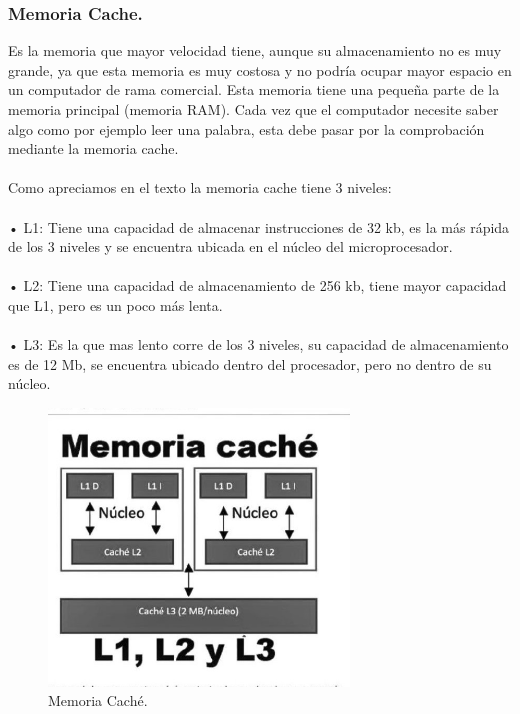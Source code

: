 \documentclass{article}
\begin{document}
\paragraph{}
\subsubsection{Memoria Cache.}	
Es la memoria que mayor velocidad tiene, aunque su almacenamiento no es muy grande, ya que esta memoria es muy costosa y no podría ocupar mayor espacio en un computador de rama comercial. Esta memoria tiene una pequeña parte de la memoria principal (memoria RAM). Cada vez que el computador necesite saber algo como por ejemplo leer una palabra, esta debe pasar por la comprobación mediante la memoria cache.
\paragraph{}
Como apreciamos en el texto\cite{texto} la memoria cache tiene 3 niveles:
\paragraph{}
•	L1: Tiene una capacidad de almacenar instrucciones de 32 kb, es la más rápida de los 3 niveles y se encuentra ubicada en el núcleo del microprocesador.
\paragraph{}
•	L2: Tiene una capacidad de almacenamiento de 256 kb, tiene mayor capacidad que L1, pero es un poco más lenta.
\paragraph{}
•	L3: Es la que mas lento corre de los 3 niveles, su capacidad de almacenamiento es de 12 Mb, se encuentra ubicado dentro del procesador, pero no dentro de su núcleo. 
\begin{figure}[h]
\includegraphics[width=8cm]{imagen2.jpg}
\centering
\caption{Memoria Caché. \cite{img2}}
\label{fig:imagen2}
\end{figure}
\end{document}
